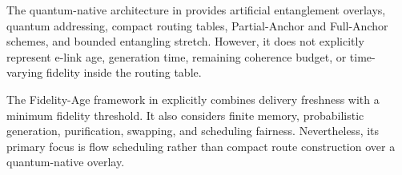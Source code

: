\begin{table}[htbp]
\centering
\caption{Comparison of Closest Prior Work}
\label{tab:closest_prior_work}
\small
{}
\end{table}

The quantum-native architecture in \cite{caleffi2025quantumarchitecture} provides artificial entanglement overlays, quantum addressing, compact routing tables, Partial-Anchor and Full-Anchor schemes, and bounded entangling stretch. However, it does not explicitly represent e-link age, generation time, remaining coherence budget, or time-varying fidelity inside the routing table.

The Fidelity-Age framework in \cite{ercetin2026fidelityage} explicitly combines delivery freshness with a minimum fidelity threshold. It also considers finite memory, probabilistic generation, purification, swapping, and scheduling fairness. Nevertheless, its primary focus is flow scheduling rather than compact route construction over a quantum-native overlay.

